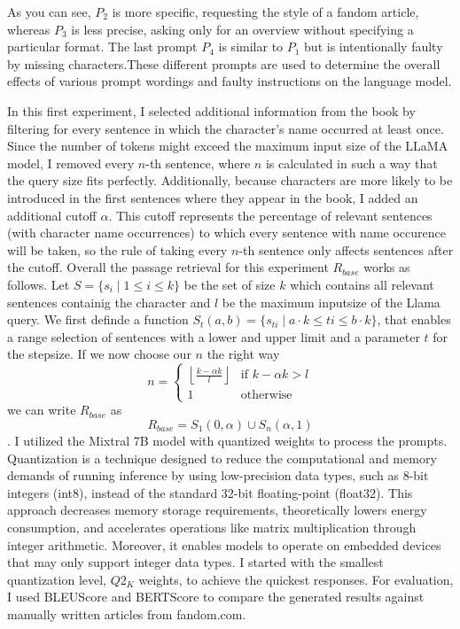 As you can see, $P_{2}$ is more specific, requesting the style of a fandom article, whereas $P_{3}$ is less precise, asking only for an overview without specifying a particular format. The last prompt $P_{4}$ is similar to $P_{1}$ but is intentionally faulty by missing characters.These different prompts are used to determine the overall effects of various prompt wordings and faulty instructions on the language model.



In this first experiment, I selected additional information from the book by filtering for every sentence in which the character's name occurred at least once. Since the number of tokens might exceed the maximum input size of the LLaMA model, I removed every $n$-th sentence, where $n$ is calculated in such a way that the query size fits perfectly.
Additionally, because characters are more likely to be introduced in the first sentences where they appear in the book, I added an additional cutoff $\alpha$. This cutoff represents the percentage of relevant sentences (with character name occurrences) to which every sentence with name occurence will be taken, so the rule of taking every $n$-th sentence only affects sentences after the cutoff. Overall the passage retrieval for this experiment $R_{base}$ works as follows. Let $S = \{s_i \mid 1 \leq i \leq k \}$ be the set of size $k$ which contains all relevant sentences containig the character and $l$ be the maximum inputsize of the Llama query. We first definde a function $S_{t}(a, b) = \{ s_{ti} \mid a \cdot k \leq ti \leq b \cdot k \}$, that enables a range selection of sentences with a lower and upper limit and a parameter $t$ for the stepsize. If we now choose our $n$ the right way
\[n = \begin{cases}
        \left\lfloor \frac{k - \alpha k}{l}\right\rfloor & \text{if } k - \alpha k > l \\
        1                                                & \text{otherwise}
    \end{cases} \] we can write $R_{base}$ as \[R_{base} = S_{1}(0, \alpha) \cup S_{n} ( \alpha, 1) \].
I utilized the Mixtral 7B model with quantized weights to process the prompts. Quantization is a technique designed to reduce the computational and memory demands of running inference by using low-precision data types, such as 8-bit integers (int8), instead of the standard 32-bit floating-point (float32). This approach decreases memory storage requirements, theoretically lowers energy consumption, and accelerates operations like matrix multiplication through integer arithmetic. Moreover, it enables models to operate on embedded devices that may only support integer data types. I started with the smallest quantization level, $Q2_K$ weights, to achieve the quickest responses. For evaluation, I used BLEUScore and BERTScore to compare the generated results against manually written articles from fandom.com.\\

